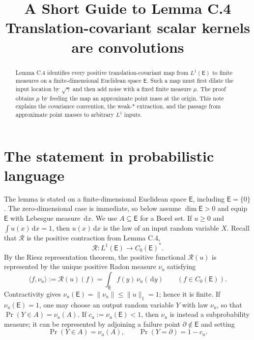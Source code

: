 \documentclass[11pt]{article}
\title{A Short Guide to Lemma C.4\\
\large Translation-covariant scalar kernels are convolutions}
\author{}
\date{}
\newcommand{\dd}{\,\mathrm d}
\begin{document}
\maketitle

\begin{abstract}
Lemma C.4 identifies every positive translation-covariant map from
$L^1(\mathsf E)$ to finite measures on a finite-dimensional Euclidean space
$\mathsf E$.  Such a map must first dilate the input
location by $\sqrt\gamma$ and then add noise with a fixed finite measure
$\mu$.  The proof obtains $\mu$ by feeding the map an approximate point mass
at the origin.  This note explains the covariance convention, the weak-*
extraction, and the passage from approximate point masses to arbitrary
$L^1$ inputs.
\end{abstract}

\section{The statement in probabilistic language}

The lemma is stated on a finite-dimensional Euclidean space $\mathsf E$,
including $\mathsf E=\{0\}$.  The zero-dimensional case is immediate, so
below assume $\dim\mathsf E>0$ and equip $\mathsf E$ with Lebesgue measure
$\dd x$.  We use $A\subseteq\mathsf E$ for a Borel set.  If
$u\geq0$ and $\int u(x)\dd x=1$, then $u(x)\dd x$ is the law of an input
random variable $X$.  Recall that $\mathcal R$ is the positive contraction
from Lemma C.4,
\[
  \mathcal R:L^1(\mathsf E)\longrightarrow C_0(\mathsf E)^*.
\]
By the Riesz representation theorem, the positive functional
$\mathcal R(u)$ is represented by the unique positive Radon measure $\nu_u$
satisfying
\[
  \langle f,\nu_u\rangle:=\mathcal R(u)(f)
  =\int_{\mathsf E}f(y)\,\nu_u(\dd y)
  \qquad(f\in C_0(\mathsf E)).
\]
Contractivity gives
$\nu_u(\mathsf E)=\|\nu_u\|\leq\|u\|_1=1$; hence it is finite.  If
$\nu_u(\mathsf E)=1$, one may choose an output random variable $Y$ with law
$\nu_u$, so that $\Pr(Y\in A)=\nu_u(A)$.  If
$c_u:=\nu_u(\mathsf E)<1$, then $\nu_u$ is instead a subprobability measure; it
can be represented by adjoining a failure point $\partial\notin\mathsf E$ and
setting
\[
  \Pr(Y\in A)=\nu_u(A),
  \qquad
  \Pr(Y=\partial)=1-c_u.
\]
\end{document}
